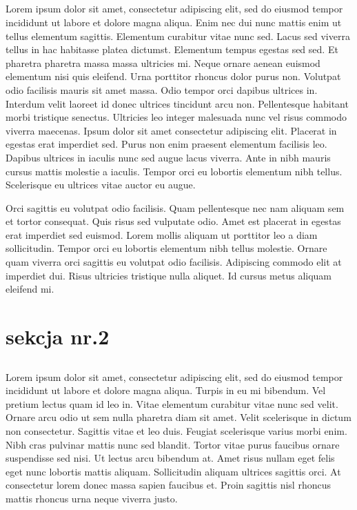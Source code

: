 \documentclass{book}
\begin{document}
\subsection{}
Lorem ipsum dolor sit amet, consectetur adipiscing elit, sed do eiusmod tempor incididunt ut labore et dolore magna aliqua. Enim nec dui nunc mattis enim ut tellus elementum sagittis. Elementum curabitur vitae nunc sed. Lacus sed viverra tellus in hac habitasse platea dictumst. Elementum tempus egestas sed sed. Et pharetra pharetra massa massa ultricies mi. Neque ornare aenean euismod elementum nisi quis eleifend. Urna porttitor rhoncus dolor purus non. Volutpat odio facilisis mauris sit amet massa. Odio tempor orci dapibus ultrices in. Interdum velit laoreet id donec ultrices tincidunt arcu non. Pellentesque habitant morbi tristique senectus. Ultricies leo integer malesuada nunc vel risus commodo viverra maecenas. Ipsum dolor sit amet consectetur adipiscing elit. Placerat in egestas erat imperdiet sed. Purus non enim praesent elementum facilisis leo. Dapibus ultrices in iaculis nunc sed augue lacus viverra. Ante in nibh mauris cursus mattis molestie a iaculis. Tempor orci eu lobortis elementum nibh tellus. Scelerisque eu ultrices vitae auctor eu augue.

Orci sagittis eu volutpat odio facilisis. Quam pellentesque nec nam aliquam sem et tortor consequat. Quis risus sed vulputate odio. Amet est placerat in egestas erat imperdiet sed euismod. Lorem mollis aliquam ut porttitor leo a diam sollicitudin. Tempor orci eu lobortis elementum nibh tellus molestie. Ornare quam viverra orci sagittis eu volutpat odio facilisis. Adipiscing commodo elit at imperdiet dui. Risus ultricies tristique nulla aliquet. Id cursus metus aliquam eleifend mi.
\section{sekcja nr.2}
\lipsum
\lipsum[3-14]
\subsection{}
Lorem ipsum dolor sit amet, consectetur adipiscing elit, sed do eiusmod tempor incididunt ut labore et dolore magna aliqua. Turpis in eu mi bibendum. Vel pretium lectus quam id leo in. Vitae elementum curabitur vitae nunc sed velit. Ornare arcu odio ut sem nulla pharetra diam sit amet. Velit scelerisque in dictum non consectetur. Sagittis vitae et leo duis. Feugiat scelerisque varius morbi enim. Nibh cras pulvinar mattis nunc sed blandit. Tortor vitae purus faucibus ornare suspendisse sed nisi. Ut lectus arcu bibendum at. Amet risus nullam eget felis eget nunc lobortis mattis aliquam. Sollicitudin aliquam ultrices sagittis orci. At consectetur lorem donec massa sapien faucibus et. Proin sagittis nisl rhoncus mattis rhoncus urna neque viverra justo.
\end{document}
